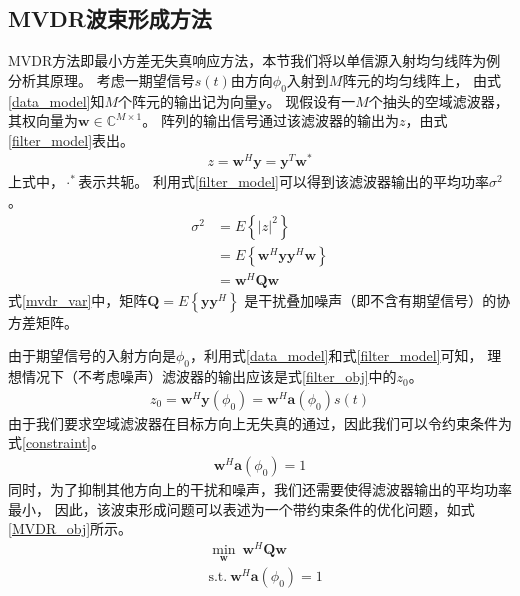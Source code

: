 \documentclass[master]{thesis-uestc}
\begin{document}
\subsection{MVDR波束形成方法}
MVDR方法即最小方差无失真响应方法，本节我们将以单信源入射均匀线阵为例分析其原理。
考虑一期望信号$s(t)$由方向$\phi_0$入射到$M$阵元的均匀线阵上，
由式\eqref{data_model}知$M$个阵元的输出记为向量$\bm{y}$。
现假设有一$M$个抽头的空域滤波器，其权向量为$\bm{w}\in\mathbb{C}^{M\times1}$。
阵列的输出信号通过该滤波器的输出为$z$，由式\eqref{filter_model}表出。
\begin{equation}\label{filter_model}
    \begin{aligned}
    z = \bm{w}^H\bm{y} = \bm{y}^T\bm{w}^*
    \end{aligned}
\end{equation}
上式中，$\cdot^*$表示共轭。
利用式\eqref{filter_model}可以得到该滤波器输出的平均功率$\sigma^2$。
\begin{equation}\label{mvdr_var}
    \begin{aligned}
    \sigma^2 &= E\left\{|z|^2\right\} \\
             &= E\left\{\bm{w}^H\bm{y}\bm{y}^H\bm{w}\right\} \\
             &= \bm{w}^H\bm{Q}\bm{w}
    \end{aligned}
\end{equation}
式\eqref{mvdr_var}中，矩阵$\bm{Q}=E\left\{\bm{y}\bm{y}^H\right\}$
是干扰叠加噪声（即不含有期望信号）的协方差矩阵。

由于期望信号的入射方向是$\phi_0$，利用式\eqref{data_model}和式\eqref{filter_model}可知，
理想情况下（不考虑噪声）滤波器的输出应该是式\eqref{filter_obj}中的$z_0$。
\begin{equation}\label{filter_obj}
    \begin{aligned}
    z_0 = \bm{w}^H\bm{y}(\phi_0) = \bm{w}^H\bm{a}(\phi_0)s(t)
    \end{aligned}
\end{equation}
由于我们要求空域滤波器在目标方向上无失真的通过，因此我们可以令约束条件为式\eqref{constraint}。
\begin{equation}\label{constraint}
    \begin{aligned}
    \bm{w}^H\bm{a}(\phi_0) = 1
    \end{aligned}
\end{equation}
同时，为了抑制其他方向上的干扰和噪声，我们还需要使得滤波器输出的平均功率最小，
因此，该波束形成问题可以表述为一个带约束条件的优化问题，如式\eqref{MVDR_obj}所示。
\begin{equation}\label{MVDR_obj}
    \begin{aligned}
    &\min_\bm{w} ~ \bm{w}^H\bm{Q}\bm{w} \\
    &\text{s.t.} ~ \bm{w}^H\bm{a}(\phi_0) = 1
    \end{aligned}
\end{equation}
\end{document}
